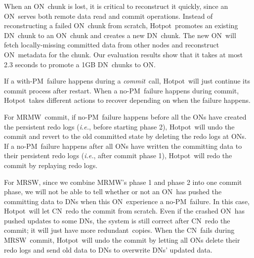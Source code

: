 \documentclass[sigconf]{acmart}
\newcommand{\ie}{\textit{i.e.}}
\newcommand{\commitxact}{\textit{commit}}
\newcommand{\nvm}{PM}
\newcommand{\hotpot}{Hotpot}
\newcommand{\mrmw}{MRMW}
\newcommand{\mrsw}{MRSW}
\newcommand{\on}{ON}
\newcommand{\dn}{DN}
\newcommand{\xn}{CN}
\newcommand{\master}{MN}
\newcommand{\redundant}{redundant}
\begin{document}
{%
When an \on\ chunk is lost, it is critical to reconstruct it quickly,
since an \on\ serves both remote data read and 
commit operations.
Instead of reconstructing a failed \on\ chunk from scratch,
\hotpot\ promotes an existing \dn\ chunk to an \on\ chunk
and creates a new \dn\ chunk.
The new \on\ will fetch locally-missing committed data from other nodes
and reconstruct \on\ metadata for the chunk.
Our evaluation results show that it takes at most 2.3 seconds to promote
a 1GB \dn\ chunks to \on.

If a with-\nvm\ failure happens during a \commitxact\ call,
\hotpot\ will just continue its commit process after restart.
When a no-\nvm\ failure happens during commit,
\hotpot\ takes different actions to recover depending on when the failure happens.

For \mrmw\ commit, if no-\nvm\ failure happens before all the \on{}s have created the persistent redo logs (\ie, before starting phase 2),
\hotpot\ will undo the commit and revert to the old committed state
by deleting the redo logs at \on{}s.
If a no-\nvm\ failure happens after all \on{}s have written the committing data to their persistent redo logs (\ie, after commit phase 1),
\hotpot\ will redo the commit by replaying redo logs.

For \mrsw, since we combine \mrmw's phase 1 and phase 2 into one commit phase,
we will not be able to tell whether or not an \on\ has pushed the committing data to \dn{}s 
when this \on\ experience a no-\nvm\ failure.
In this case, \hotpot\ will let \xn\ redo the commit from scratch. 
Even if the crashed \on\ has pushed updates to some \dn{}s,
the system is still correct after \xn\ redo the commit;
it will just have more \redundant\ copies.
When the \xn\ fails during \mrsw\ commit, \hotpot\ will undo the commit
by letting all \on{}s delete their redo logs and send old data to \dn{}s to overwrite \dn{}s' updated data.

}
\end{document}
